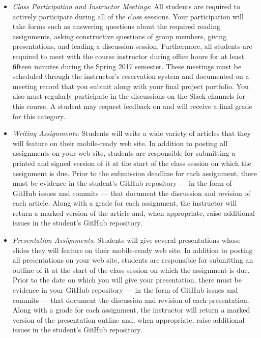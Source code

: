 \begin{itemize}

  \itemsep0em

  \item {\em Class Participation and Instructor Meetings\/}: All students are required to actively participate during
    all of the class sessions. Your participation will take forms such as answering questions about the required reading
    assignments, asking constructive questions of group members, giving presentations, and leading a discussion session.
    Furthermore, all students are required to meet with the course instructor during office hours for at least fifteen
    minutes during the Spring 2017 semester. These meetings must be scheduled through the instructor's reservation
    system and documented on a meeting record that you submit along with your final project portfolio. You also must
    regularly participate in the discussions on the Slack channels for this course. A student may request feedback on
    and will receive a final grade for this category.

  \item {\em Writing Assignments}: Students will write a wide variety of articles that they will feature on their
    mobile-ready web site. In addition to posting all assignments on your web site, students are responsible for
    submitting a printed and signed version of it at the start of the class session on which the assignment is due.
    Prior to the submission deadline for each assignment, there must be evidence in the student's GitHub repository ---
    in the form of GitHub issues and commits --- that document the discussion and revision of each article. Along with a
    grade for each assignment, the instructor will return a marked version of the article and, when appropriate, raise
    additional issues in the student's GitHub repository.

  \item {\em Presentation Assignments}: Students will give several presentations whose slides they will feature on their
    mobile-ready web site. In addition to posting all presentations on your web site, students are responsible for
    submitting an outline of it at the start of the class session on which the assignment is due. Prior to the date on
    which you will give your presentation, there must be evidence in your GitHub repository --- in the form of GitHub
    issues and commits --- that document the discussion and revision of each presentation. Along with a grade for each
    assignment, the instructor will return a marked version of the presentation outline and, when appropriate, raise
    additional issues in the student's GitHub repository.


\end{itemize}
